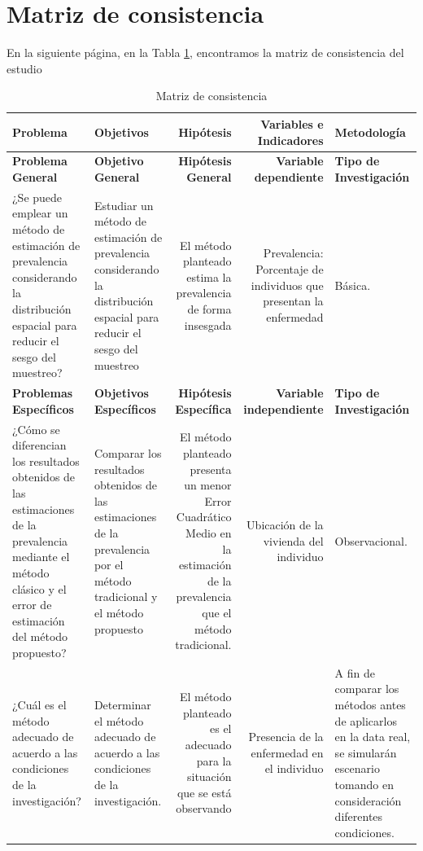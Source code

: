 \section{Matriz de consistencia}
En la siguiente página, en la Tabla \ref{matcons}, encontramos la matriz de consistencia del estudio
\newpage
\begin{landscape}

\begin{table}[htbp]
  \centering
  \caption{Matriz de consistencia}\label{matcons}
  \vspace{0.5cm}
    \begin{tabular}{|p{11.07em}|p{11.07em}|r|r|p{11.07em}|}
    \toprule
    \textbf{Problema} & \textbf{Objetivos} & \multicolumn{1}{p{11.07em}|}{\textbf{Hipótesis}} & \multicolumn{1}{p{11.07em}|}{\textbf{Variables e Indicadores}} & \textbf{Metodología} \\
    \midrule
    \textbf{Problema General} & \textbf{Objetivo General} & \multicolumn{1}{p{11.07em}|}{\textbf{Hipótesis General}} & \multicolumn{1}{p{11.07em}|}{\textbf{Variable dependiente}} & \textbf{Tipo de Investigación} \\
    ¿Se puede emplear un método de estimación de prevalencia considerando la distribución espacial para reducir el sesgo del muestreo? & Estudiar un método de estimación de prevalencia considerando la distribución espacial para reducir el sesgo del muestreo & \multicolumn{1}{p{11.07em}|}{El método planteado estima la prevalencia de forma insesgada} & \multicolumn{1}{p{11.07em}|}{Prevalencia: Porcentaje de individuos que presentan la enfermedad} & Básica. \\
    \textbf{Problemas Específicos} & \textbf{Objetivos Específicos} & \multicolumn{1}{p{11.07em}|}{\textbf{Hipótesis Específica}} & \multicolumn{1}{p{11.07em}|}{\textbf{Variable independiente}} & \textbf{Tipo de Investigación} \\
    ¿Cómo se diferencian los resultados obtenidos de las estimaciones de la prevalencia mediante el método clásico y el error de estimación del método propuesto? & Comparar los resultados obtenidos de las estimaciones de la prevalencia por el método tradicional y el método propuesto & \multicolumn{1}{p{11.07em}|}{El método planteado presenta un menor Error Cuadrático Medio en la estimación de la prevalencia que el método tradicional.} & \multicolumn{1}{p{11.07em}|}{Ubicación de la vivienda del individuo} & Observacional. \\
    ¿Cuál es el método adecuado de acuerdo a las condiciones de la investigación? & Determinar el método adecuado de acuerdo a las condiciones de la investigación. & \multicolumn{1}{p{11.07em}|}{El método planteado es el adecuado para la situación que se está observando} & \multicolumn{1}{p{11.07em}|}{Presencia de la enfermedad en el individuo} & A fin de comparar los métodos antes de aplicarlos en la data real, se simularán escenario tomando en consideración diferentes condiciones. \\

\end{tabular}
\end{table}
\end{landscape}
